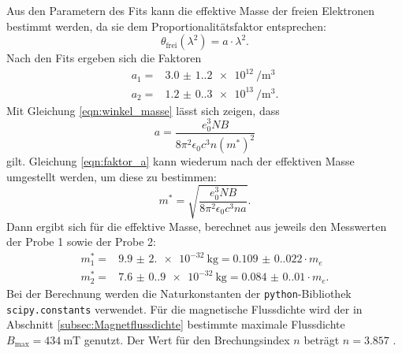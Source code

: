 \noindent
Aus den Parametern des Fits kann die effektive Masse der freien Elektronen bestimmt werden,
da sie dem Proportionalitätsfaktor entsprechen:
\begin{equation*}
  \theta_{\text{frei}} (\lambda^{2}) = a \cdot \lambda^{2}.
\end{equation*}
Nach den Fits ergeben sich die Faktoren
\begin{align}
  a_{1} = & \SI{3.0(1.2)e12}{\per\meter\cubed} \\
  a_{2} = & \SI{1.2(0.3)e13}{\per\meter\cubed}.
\end{align}
Mit Gleichung \ref{eqn:winkel_masse} lässt sich zeigen, dass
\begin{equation}
  a = \frac{e_{0}^{3} N B}{8 \pi^{2} \epsilon_{0} c^{3} n (m^{*})^{2}}
  \label{eqn:faktor_a}
\end{equation}
gilt. Gleichung \ref{eqn:faktor_a} kann wiederum nach der effektiven Masse
umgestellt werden, um diese zu bestimmen:
\begin{equation}
  m^{*} = \sqrt{\frac{e_{0}^{3} N B}{8 \pi^{2} \epsilon_{0} c^{3} n a}}.
  \label{eqn:effektive_masse_aus_a}
\end{equation}
Dann ergibt sich für die effektive Masse, berechnet aus jeweils den
Messwerten der Probe 1 sowie der Probe 2:
\begin{align}
  m_{1}^{*} = & \SI{9.9(2.0)e-32}{\kilo\gram} = \num{0.109(0.022)} \cdot m_{e} \\
  m_{2}^{*} = & \SI{7.6(0.9)e-32}{\kilo\gram} = \num{0.084(0.010)} \cdot m_{e}.
\end{align}
Bei der Berechnung werden die Naturkonstanten der \texttt{python}-Bibliothek
\texttt{scipy.constants} verwendet. Für die magnetische Flussdichte wird der
in Abschnitt \ref{subsec:Magnetflussdichte} bestimmte maximale Flussdichte
$B_{\text{max}} = \SI{434}{\milli\tesla}$ genutzt. Der Wert für den
Brechungsindex $n$ beträgt $n = 3.857$ \cite{Brechungsindex}.
